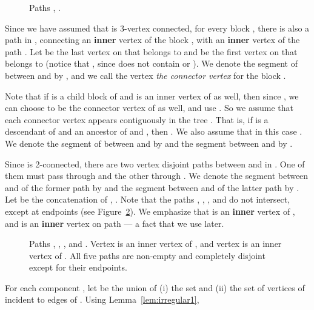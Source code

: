 \documentclass[twoside,leqno,twocolumn]{article}
\begin{document}
\begin{figure}[h]
\begin{center}
 \caption{Paths , .} \label{fig: paths pout}
\end{center}
\end{figure}



Since we have assumed that  is 3-vertex connected, for every block , there is also a path  in , connecting
an {\bf inner} vertex of the block , with an {\bf inner} vertex of the path . 
Let  be the last vertex on  that belongs to  and  
be the first vertex on  that belongs to  (notice that , since  does not contain  or ). We denote the segment of  
between  and  by , and we call the vertex  \textit{the connector vertex} for 
the block . 

Note that if  is a child block of  and  is an inner vertex of  as well, then since , we can choose
 to be the connector vertex of  as well, and use .  So we assume that each connector 
vertex  appears contiguously in the tree . That is, if  is a descendant
of  and an ancestor of  and , then . We also assume that in this case .
We denote the segment of  between  and  by  and the segment
between  and  by . 

Since  is 2-connected, there are 
two vertex disjoint paths between  and  in . One of them must pass through 
and the other through . We denote the segment between  and  of the former path
by  and the segment between  and  of the latter path by .
Let  be the concatenation of , .
Note that the paths , , ,  and 
do not intersect, except at endpoints (see Figure~\ref{fig: paths pout2}). We emphasize that  is an {\bf inner} vertex of , and  is an {\bf inner} vertex on path  --- a fact that we use later.


\begin{figure}[h]
\begin{center}
 \caption{Paths , , ,  and . Vertex  is an inner vertex of , and vertex  is an inner vertex of . All five paths are non-empty and completely disjoint except for their endpoints.} \label{fig: paths pout2}
\end{center}
\end{figure}

For each component , let  be the union of 
(i) the set  and (ii) the set of vertices of  incident to edges of . 
 Using Lemma~\ref{lem:irregular1},
\end{document}

